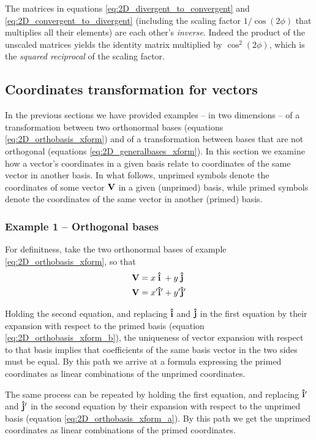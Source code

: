 The matrices in equations \ref{eq:2D_divergent_to_convergent} and \ref{eq:2D_convergent_to_divergent} (including the scaling factor $1/\cos(2\phi)$ that multiplies all their elements) are each other's \textit{inverse}. Indeed the product of the unscaled matrices yields the identity matrix multiplied by $\cos^2(2\phi)$, which is the \textit{squared reciprocal} of the scaling factor. 

\subsection{Coordinates transformation for vectors}
In the previous sections we have provided examples -- in two dimensions -- of a transformation between two orthonormal bases (equations \ref{eq:2D_orthobasis_xform}) and of a transformation between bases that are not orthogonal (equations \ref{eq:2D_generalbases_xform}). In this section we examine how a vector's coordinates in a given basis relate to coordinates of the same vector in another basis. In what follows, unprimed symbols denote the coordinates of some vector $\vb{V}$ in a given (unprimed) basis, while primed symbols denote the coordinates of the same vector in another (primed) basis. 
\subsubsection{Example 1 -- Orthogonal bases}
For definitness, take the two orthonormal bases of example \ref{eq:2D_orthobasis_xform}, so that 
\begin{align*}
\vb{V} &= x \;\vu{i}\; + y\; \vu{j}\; \\
\vb{V} &= x' \vu{i}' + y' \vu{j}'  
\end{align*} 

Holding the second equation, and replacing $\vu{i}$ and $\vu{j}$ in the first equation by their expansion with respect to the primed basis (equation \ref{eq:2D_orthobasis_xform_b}), the uniqueness of vector expansion with respect to that basis implies that coefficients of the same basis vector in the two sides must be equal. By this path we arrive at a formula expressing the primed coordinates as linear combinations of the unprimed coordinates. 

The same process can be repeated by holding the first equation, and replacing $\vu{i}'$ and $\vu{j}'$ in the second equation by their expansion with respect to the unprimed basis (equation \ref{eq:2D_orthobasis_xform_a}). By this path we get the unprimed coordinates as linear combinations of the primed coordinates. 

